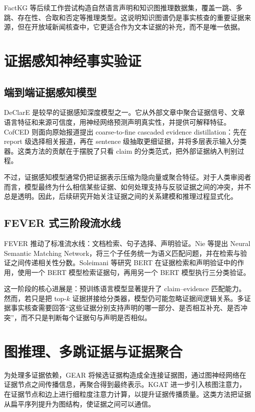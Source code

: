 \documentclass[UTF8,a4paper,zihao=5,twocolumn]{ctexart}
\begin{document}
FactKG 等后续工作尝试构造自然语言声明和知识图推理数据集，覆盖一跳、多跳、存在性、合取和否定等推理类型\cite{Kim2023FactKG}。这说明知识图谱仍是事实核查的重要证据来源，但在开放域新闻核查中，它更适合作为文本证据的补充，而不是唯一依据。

\section{证据感知神经事实验证}

\subsection{端到端证据感知模型}

DeClarE 是较早的证据感知深度模型之一。它从外部文章中聚合证据信号、文章语言特征和来源可信度，用神经网络预测声明真实性，并提供可解释特征\cite{Popat2018DeClarE}。CofCED 则面向原始报道提出 coarse-to-fine cascaded evidence distillation：先在 report 级选择相关报道，再在 sentence 级抽取更细证据，并将多层表示输入分类器\cite{Yang2022CofCED}。这类方法的贡献在于摆脱了只看 claim 的分类范式，把外部证据纳入判别过程。

不过，证据感知模型通常仍把证据表示压缩为隐向量或聚合特征。对于人类审阅者而言，模型最终为什么相信某些证据、如何处理支持与反驳证据之间的冲突，并不总是透明。因此，后续研究开始关注证据之间的关系建模和推理过程显式化。

\subsection{FEVER 式三阶段流水线}

FEVER 推动了标准流水线：文档检索、句子选择、声明验证。Nie 等提出 Neural Semantic Matching Network，将三个子任务统一为语义匹配问题，并在检索与验证之间传递相关性分数\cite{Nie2019NSMN}。Soleimani 等研究 BERT 在证据检索和声明验证中的作用，使用一个 BERT 模型检索证据句，再用另一个 BERT 模型执行三分类验证\cite{Soleimani2019BERTFEVER}。

这一阶段的核心进展是：预训练语言模型显著提升了 claim--evidence 匹配能力。然而，若只是把 top-$k$ 证据拼接给分类器，模型仍可能忽略证据间逻辑关系。多证据事实核查需要回答“这些证据分别支持声明的哪一部分、是否相互补充、是否冲突”，而不只是判断每个证据句与声明是否相似。

\section{图推理、多跳证据与证据聚合}

为处理多证据依赖，GEAR 将候选证据构造成全连接证据图，通过图神经网络在证据节点之间传播信息，再聚合得到最终表示\cite{Zhou2019GEAR}。KGAT 进一步引入核图注意力，在证据节点和边上进行细粒度注意力计算，以提升证据传播质量\cite{Liu2019KGAT}。这类方法把证据从扁平序列提升为图结构，使证据之间可以通信。
\end{document}
